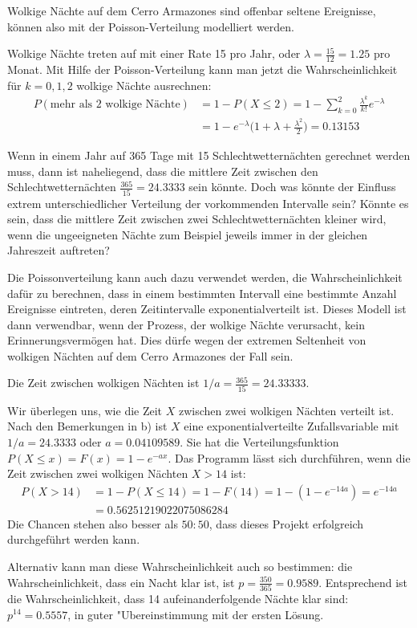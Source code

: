\begin{loesung}
Wolkige Nächte auf dem Cerro Armazones sind offenbar seltene
Ereignisse, können also mit der Poisson-Verteilung modelliert
werden.
\begin{teilaufgaben}
\item Wolkige Nächte treten auf mit einer Rate 15 pro Jahr, oder
$\lambda=\frac{15}{12}=1.25$ pro Monat. Mit Hilfe der Poisson-Verteilung
kann man jetzt die Wahrscheinlichkeit für $k=0,1,2$ wolkige Nächte
ausrechnen:
\begin{align*}
P(\text{mehr als 2 wolkige Nächte})
&=1-P(X\le 2)
=
1-\sum_{k=0}^2\frac{\lambda^k}{k!}e^{-\lambda}
\\
&=1-e^{-\lambda}\biggl(1+\lambda+\frac{\lambda^2}2\biggr)
=0.13153
\end{align*}
\item 
Wenn in einem Jahr auf 365 Tage mit 15 Schlechtwetternächten gerechnet
werden muss, dann ist naheliegend, dass die  mittlere Zeit zwischen
den Schlechtwetternächten $\frac{365}{15}=24.3333$ sein könnte.
Doch was könnte der Einfluss extrem unterschiedlicher Verteilung
der vorkommenden Intervalle sein? Könnte es sein, dass die mittlere
Zeit zwischen zwei Schlechtwetternächten kleiner wird, wenn die
ungeeigneten Nächte zum Beispiel jeweils immer in der gleichen Jahreszeit
auftreten?

Die Poissonverteilung kann auch dazu verwendet werden, die Wahrscheinlichkeit
dafür zu berechnen, dass in einem bestimmten Intervall eine bestimmte
Anzahl Ereignisse eintreten, deren Zeitintervalle exponentialverteilt ist.
Dieses Modell ist dann verwendbar, wenn der Prozess, der wolkige Nächte
verursacht, kein Erinnerungsvermögen hat. Dies dürfe wegen der extremen
Seltenheit von wolkigen Nächten auf dem Cerro Armazones der Fall sein.

Die Zeit zwischen wolkigen Nächten ist $1/a=\frac{365}{15}=24.33333$.
\item
Wir überlegen uns, wie
die Zeit $X$ zwischen zwei wolkigen Nächten verteilt ist. Nach den Bemerkungen
in b) ist $X$ eine exponentialverteilte Zufallsvariable mit $1/a=24.3333$
oder $a=0.04109589$.
Sie hat die Verteilungsfunktion
$
P(X\le x)=
F(x)=1-e^{-ax}.
$
Das Programm lässt sich durchführen, wenn die Zeit zwischen zwei
wolkigen Nächten $X> 14$ ist:
\begin{align*}
P(X> 14)&=1-P(X\le 14)=1-F(14)=1-(1-e^{-14a})=e^{-14a}
\\
&= 0.56251219022075086284
\end{align*}
Die Chancen stehen also besser als $50:50$, dass dieses Projekt
erfolgreich durchgeführt werden kann.

Alternativ kann man diese Wahrscheinlichkeit auch so bestimmen:
die Wahrscheinlichkeit, dass ein Nacht klar ist, ist $p=\frac{350}{365}=0.9589$.
Entsprechend ist die Wahrscheinlichkeit, dass 14 aufeinanderfolgende
Nächte klar sind: $p^{14}=0.5557$, in guter "Ubereinstimmung mit der
ersten Lösung.
\qedhere
\end{teilaufgaben}
\end{loesung}

